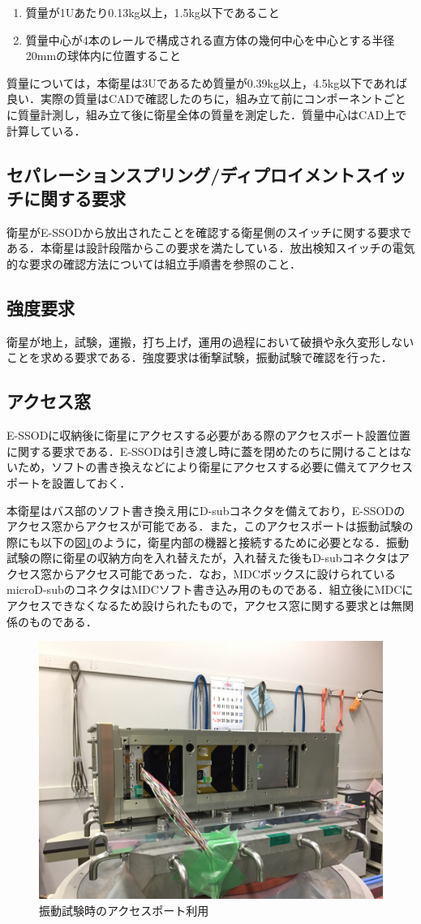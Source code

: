 \begin{enumerate}
	\item 質量が1Uあたり0.13kg以上，1.5kg以下であること
	\item 質量中心が4本のレールで構成される直方体の幾何中心を中心とする半径20mmの球体内に位置すること
\end{enumerate}

質量については，本衛星は3Uであるため質量が0.39kg以上，4.5kg以下であれば良い．実際の質量はCADで確認したのちに，組み立て前にコンポーネントごとに質量計測し，組み立て後に衛星全体の質量を測定した．質量中心はCAD上で計算している．

\subsection{セパレーションスプリング/ディプロイメントスイッチに関する要求}

衛星がE-SSODから放出されたことを確認する衛星側のスイッチに関する要求である．本衛星は設計段階からこの要求を満たしている．放出検知スイッチの電気的な要求の確認方法については組立手順書を参照のこと．

\subsection{強度要求}
衛星が地上，試験，運搬，打ち上げ，運用の過程において破損や永久変形しないことを求める要求である．強度要求は衝撃試験，振動試験で確認を行った．

\subsection{アクセス窓}
E-SSODに収納後に衛星にアクセスする必要がある際のアクセスポート設置位置に関する要求である．E-SSODは引き渡し時に蓋を閉めたのちに開けることはないため，ソフトの書き換えなどにより衛星にアクセスする必要に備えてアクセスポートを設置しておく．

本衛星はバス部のソフト書き換え用にD-subコネクタを備えており，E-SSODのアクセス窓からアクセスが可能である．また，このアクセスポートは振動試験の際にも以下の図\ref{fig:accessport}のように，衛星内部の機器と接続するために必要となる．振動試験の際に衛星の収納方向を入れ替えたが，入れ替えた後もD-subコネクタはアクセス窓からアクセス可能であった．なお，MDCボックスに設けられているmicroD-subのコネクタはMDCソフト書き込み用のものである．組立後にMDCにアクセスできなくなるため設けられたもので，アクセス窓に関する要求とは無関係のものである．

\begin{figure}[h]
	\begin{center}
		
		\includegraphics[width=0.6\linewidth]{04/fig/accessport.JPG}
		\caption{振動試験時のアクセスポート利用}
		\label{fig:accessport}
		
	\end{center}
\end{figure}